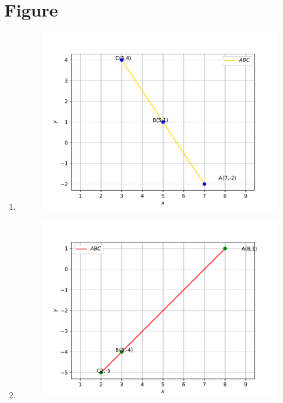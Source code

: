 \documentclass[journal,12pt,twocolumn]{IEEEtran}
\begin{document}
\section{\textbf{Figure}}
\begin{enumerate}[label=(\roman*)]
\item
\begin{figure}[!ht]
    \centering
\includegraphics[width=\columnwidth]{vec-1.pdf}
\caption{}
\label{fig:vec}
\end{figure}
\item
\begin{figure}[!ht]
    \centering
\includegraphics[width=\columnwidth]{vec-2.pdf}
\caption{}
\label{fig:vec}
\end{figure}
\end{enumerate}
\end{document}

